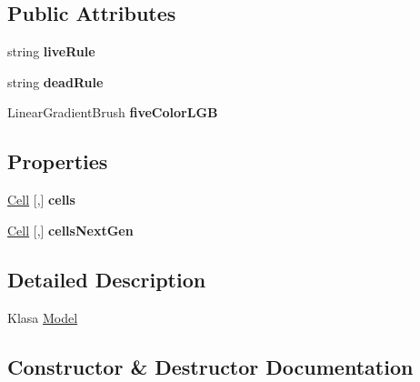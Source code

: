 \subsection*{Public Attributes}
\begin{DoxyCompactItemize}
\item 
\mbox{\label{class_game_of_life_1_1_model_a304757756aa41720a21a621ccfabfda3}} 
string {\bfseries live\+Rule}
\item 
\mbox{\label{class_game_of_life_1_1_model_a18b321b1f480cc507a8f7af13c43cf40}} 
string {\bfseries dead\+Rule}
\item 
\mbox{\label{class_game_of_life_1_1_model_a2e8279a1b09b8d952736313501b4c133}} 
Linear\+Gradient\+Brush {\bfseries five\+Color\+L\+GB}
\end{DoxyCompactItemize}
\subsection*{Properties}
\begin{DoxyCompactItemize}
\item 
\mbox{\label{class_game_of_life_1_1_model_aedb19d68a95ecbf78f7f58950c911598}} 
\mbox{\hyperlink{class_game_of_life_1_1_cell}{Cell}} \mbox{[},\mbox{]} {\bfseries cells}
\item 
\mbox{\label{class_game_of_life_1_1_model_abd08d82762b8e603a66245b95591911a}} 
\mbox{\hyperlink{class_game_of_life_1_1_cell}{Cell}} \mbox{[},\mbox{]} {\bfseries cells\+Next\+Gen}
\end{DoxyCompactItemize}


\subsection{Detailed Description}
Klasa \mbox{\hyperlink{class_game_of_life_1_1_model}{Model}} 



\subsection{Constructor \& Destructor Documentation}
\mbox{\label{class_game_of_life_1_1_model_a4f6448745349c6f9d1f328a67e387570}} 

